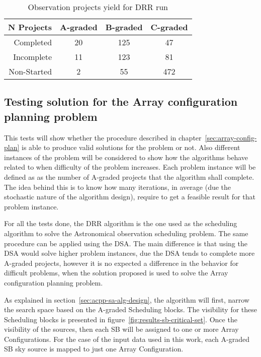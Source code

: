 \begin{table}[t!]
\centering
\begin{tabular}{|r|c|c|c|} \hline
 N Projects & A-graded & B-graded & C-graded \\ \hline
 Completed & 20 & 125 & 47 \\ \hline
 Incomplete & 11 & 123 & 81 \\ \hline
 Non-Started & 2 & 55 & 472 \\ \hline
\end{tabular}
\caption{Observation projects yield for DRR run}
\label{table:drr-run-summary}
\end{table}

\subsection{Testing solution for the Array configuration planning problem}
This tests will show whether the procedure described in chapter~\ref{sec:array-config-plan} is able to produce valid solutions for the problem or not. Also different instances of the problem will be considered to show how the algorithms behave related to when difficulty of the problem increases. Each problem instance will be defined as as the number of A-graded projects that the algorithm shall complete. The idea behind this is to know how many iterations, in average (due the stochastic nature of the algorithm design), require to get a feasible result for that problem instance.

For all the tests done, the DRR algorithm is the one used as the scheduling algorithm to solve the Astronomical observation scheduling problem. The same procedure can be applied using the DSA. The main difference is that using the DSA would solve higher problem instances, due the DSA tends to complete more A-graded projects, however it is no expected a difference in the behavior for difficult problems, when the solution proposed is used to solve the Array configuration planning problem.   

As explained in section~\ref{sec:acpp-sa-alg-design}, the algorithm will first, narrow the search space based on the A-graded Scheduling blocks.  The visibility for these Scheduling blocks is presented in figure~\ref{fig:results-sb-critical-set}. Once the visibility of the sources, then each SB will be assigned to one or more Array Configurations. For the case of the input data used in this work, each A-graded SB sky source is mapped to just one Array Configuration.

